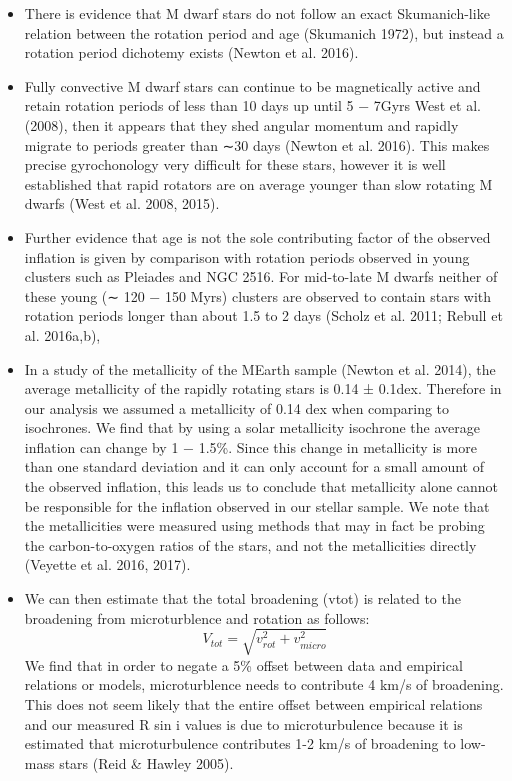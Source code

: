\begin{itemize}
\item There is evidence that M dwarf stars do not follow an exact Skumanich-like relation between the rotation period and age (Skumanich 1972), but instead a rotation period dichotemy exists (Newton et al. 2016).

\item  Fully convective M dwarf stars can continue to be magnetically active and retain rotation periods of less than 10 days up until 5 − 7Gyrs West et al. (2008), then it appears that they shed angular momentum and rapidly migrate to periods greater than ∼30 days (Newton et al. 2016). This makes precise gyrochonology very difficult for these stars, however it is well established that rapid rotators are on average younger than slow rotating M dwarfs (West et al. 2008, 2015). 

\item Further evidence that age is not the sole contributing factor of the observed inflation is given by comparison with rotation periods observed in young clusters such as Pleiades and NGC 2516. For mid-to-late M dwarfs neither of  these young (∼ 120 − 150 Myrs) clusters are observed to contain stars with rotation periods longer than about 1.5 to 2 days (Scholz et al. 2011; Rebull et al. 2016a,b),

\item In a study of the metallicity of the MEarth sample (Newton et al. 2014), the average metallicity of the rapidly rotating stars is 0.14 ± 0.1dex. Therefore in our analysis we assumed a metallicity of 0.14 dex when comparing to isochrones. We find that by using a solar metallicity isochrone the average inflation can change by 1 − 1.5\%. Since this change in metallicity is more than one standard deviation and it can only account for a small amount of the observed inflation, this leads us to conclude that metallicity alone cannot be responsible for the inflation observed in our stellar sample. We note that the metallicities were measured using methods that may in fact be probing the carbon-to-oxygen ratios of the stars, and not the metallicities directly (Veyette et al. 2016, 2017).

\item We can then estimate that the total broadening (vtot) is related to the broadening from microturblence and rotation as follows:
\begin{equation}
V_{tot} = \sqrt{v_{rot}^2 + v_{micro}^2}
\end{equation}
 We find that in order to negate a 5\% offset between data and empirical relations or models, microturblence needs to contribute 4 km/s of broadening. This does not seem likely that the entire offset between empirical relations and our measured R sin i values is due to microturbulence because it is estimated that microturbulence contributes 1-2 km/s of broadening to low-mass stars (Reid \& Hawley 2005).
 

\end{itemize}
